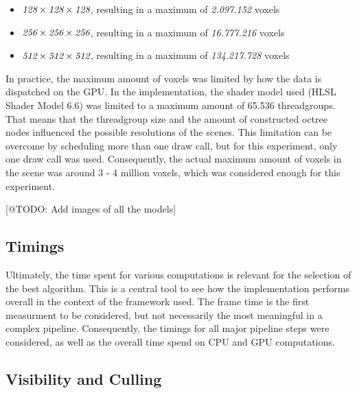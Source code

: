 \begin{itemize}
    \item \begin{math} \emph{128} \times \emph{128} \times \emph{128}\end{math}, resulting in a maximum of \emph{2.097.152} voxels
    \item \begin{math} \emph{256} \times \emph{256} \times \emph{256}\end{math}, resulting in a maximum of \emph{16.777.216} voxels
    \item \begin{math} \emph{512} \times \emph{512} \times \emph{512}\end{math}, resulting in a maximum of \emph{134.217.728} voxels
\end{itemize}

\noindent
In practice, the maximum amount of voxels was limited by how the data is dispatched on the \ac{GPU}. In the 
implementation, the shader model used (HLSL Shader Model 6.6) was limited to a maximum amount of 65.536 
threadgroups. That means that the threadgroup size and the amount of constructed octree nodes influenced the 
possible resolutions of the scenes. This limitation can be overcome by scheduling more than one draw call, 
but for this experiment, only one draw call was used. Consequently, the actual maximum amount of voxels in the 
scene was around 3 - 4 million voxels, which was considered enough for this experiment.

[@TODO: Add images of all the models]


\subsection*{Timings}

Ultimately, the time spent for various computations is relevant for the selection of the best algorithm. This is 
a central tool to see how the implementation performs overall in the context of the framework used. The frame 
time is the first measurment to be considered, but not necessarily the most meaningful in a complex pipeline. 
Consequently, the timings for all major pipeline steps were considered, as well as the overall time spend on 
\ac{CPU} and \ac{GPU} computations. 


\subsection*{Visibility and Culling}

